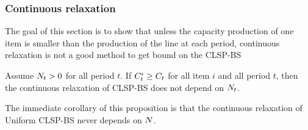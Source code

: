 \subsubsection{Continuous relaxation}

The goal of this section is to show that unless the capacity production of one item is smaller than the production of the line at each period, continuous relaxation is not a good method to get bound on the CLSP-BS





\begin{prop}\label{prop:relaxation-independant-N}
Assume $N_t>0$ for all period $t$.
If $C_t^i\ge C_t$ for all item $i$ and all period $t$, then the continuous relaxation of CLSP-BS does not depend on $N_t$.
\end{prop}

The immediate corollary of this proposition is that the continuous relaxation of Uniform CLSP-BS never depends on $N$.


